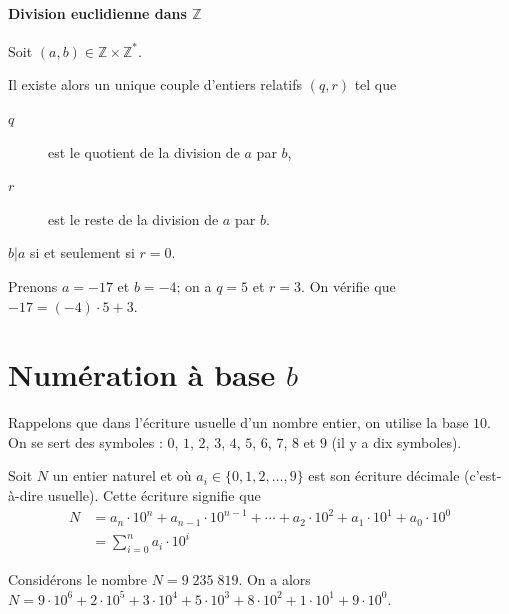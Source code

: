\paragraph{Division euclidienne dans $\mathbb{Z}$} 
\begin{thm}[Admis]
\label{thm:division euclidienne}
Soit $(a,b) \in \mathbb{Z} \times \mathbb{Z}^*$.
\par\smallskip
Il existe alors un unique couple d'entiers relatifs $(q,r)$ tel que
\par\noindent
\begin{description}
      \item[$q$] est le quotient de la division de $a$ par $b$,      
      \item[$r$] est le reste de la division de $a$ par $b$.      
\end{description}
$b|a$ si et seulement si $r=0$.
      \begin{ex}
      Prenons $a = -17$ et $b = -4$; on a $q = 5$ et $r = 3$.
            On v\'erifie que $-17 = (-4) \cdot 5 + 3$.
      \end{ex}
\end{thm}
%
\section{Num\'eration \`a base $b$}
      Rappelons que dans l'\'ecriture usuelle d'un nombre entier, on utilise la base $10$.
      On se sert des symboles : $0$, $1$, $2$, $3$, $4$, $5$, $6$, $7$, $8$ et $9$ (il y a dix symboles).
      
      Soit $N$ un entier naturel et
      o\`u $a_i \in \{ 0, 1, 2, \dots , 9 \}$ est son \'ecriture d\'ecimale (c'est-\`a-dire usuelle).
      Cette \'ecriture signifie que 
            \begin{align*}
            N & = a_{n} \cdot 10^{n} + a_{n-1} \cdot 10^{n-1} + \cdots 
                  + a_{2} \cdot 10^{2} + a_{1} \cdot 10^{1} + a_{0} \cdot 10^{0}            \\
              & = \sum_{i=0}^{n} a_{i} \cdot 10^{i}
            \end{align*}
      \begin{ex}
            Consid\'erons le nombre $N = 9\;235\;819$.
            On a alors 
            $N = 9\cdot 10^{6} + 2\cdot 10^{5} + 3\cdot 10^{4} + 5\cdot 10^{3} + 8\cdot 10^{2} + 1\cdot 10^{1} + 9\cdot 10^{0}$.
      \end{ex}
      
